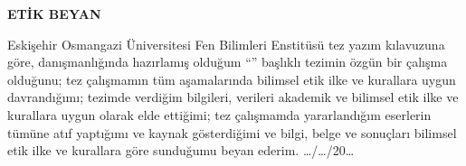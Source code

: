 \begin{center}
\Large\textbf{ETİK BEYAN}
\end{center}
\normalsize
\vspace{3cm}

Eskişehir Osmangazi Üniversitesi Fen Bilimleri Enstitüsü tez yazım kılavuzuna göre, \danisman\space danışmanlığında hazırlamış olduğum “\textbf{\tbaslik}” başlıklı tezimin özgün bir çalışma olduğunu; tez çalışmamın tüm aşamalarında bilimsel etik ilke ve kurallara uygun davrandığımı; tezimde verdiğim bilgileri, verileri akademik ve bilimsel etik ilke ve kurallara uygun olarak elde ettiğimi; tez çalışmamda yararlandığım eserlerin tümüne atıf yaptığımı ve kaynak gösterdiğimi ve bilgi, belge ve sonuçları bilimsel etik ilke ve kurallara göre sunduğumu beyan ederim.   …/…/20…
\vspace{3cm}

\begin{flushright}
\yazar
\end{flushright}